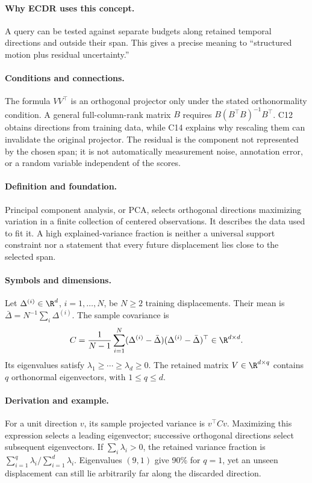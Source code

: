 \paragraph{Why ECDR uses this concept.}
A query can be tested against separate budgets along retained temporal directions and outside their span. This gives a precise meaning to ``structured motion plus residual uncertainty.''
\paragraph{Conditions and connections.}
The formula $VV^\top$ is an orthogonal projector only under the stated orthonormality condition. A general full-column-rank matrix $B$ requires $B(B^\top B)^{-1}B^\top$. C12 obtains directions from training data, while C14 explains why rescaling them can invalidate the original projector. The residual is the component not represented by the chosen span; it is not automatically measurement noise, annotation error, or a random variable independent of the scores.

\paragraph{Definition and foundation.}
Principal component analysis, or PCA, selects orthogonal directions maximizing variation in a finite collection of centered observations. It describes the data used to fit it. A high explained-variance fraction is neither a universal support constraint nor a statement that every future displacement lies close to the selected span.
\paragraph{Symbols and dimensions.}
Let $\Delta^{(i)}\in\R^d$, $i=1,\ldots,N$, be $N\ge2$ training displacements. Their mean is $\bar\Delta=N^{-1}\sum_i\Delta^{(i)}$. The sample covariance is
\[
 C=\frac1{N-1}\sum_{i=1}^{N}(\Delta^{(i)}-\bar\Delta)
 (\Delta^{(i)}-\bar\Delta)^\top\in\R^{d\times d}.
\]
Its eigenvalues satisfy $\lambda_1\ge\cdots\ge\lambda_d\ge0$. The retained matrix $V\in\R^{d\times q}$ contains $q$ orthonormal eigenvectors, with $1\le q\le d$.
\paragraph{Derivation and example.}
For a unit direction $v$, its sample projected variance is $v^\top Cv$. Maximizing this expression selects a leading eigenvector; successive orthogonal directions select subsequent eigenvectors. If $\sum_i\lambda_i>0$, the retained variance fraction is $\sum_{i=1}^{q}\lambda_i/\sum_{i=1}^{d}\lambda_i$. Eigenvalues $(9,1)$ give 90\% for $q=1$, yet an unseen displacement can still lie arbitrarily far along the discarded direction.
